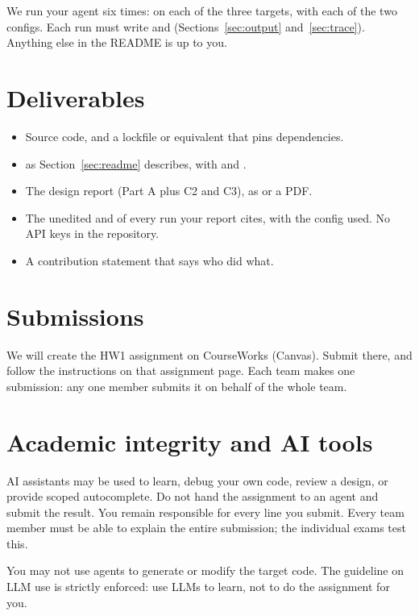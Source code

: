 \documentclass[9pt,letterpaper]{article}
\begin{document}
We run your agent six times: on each of the three targets, with each of the two
configs. Each run must write  and 
(Sections~\ref{sec:output} and~\ref{sec:trace}). Anything else in the README is
up to you.

\section{Deliverables}
\begin{itemize}
\item Source code, and a lockfile or equivalent that pins dependencies.
\item {} as Section~\ref{sec:readme} describes, with
   and .
\item The design report (Part A plus C2 and C3), as  or a PDF.
\item The unedited  and  of every run
  your report cites, with the config used. No API keys in the repository.
\item A contribution statement that says who did what.
\end{itemize}

\section{Submissions}

We will create the HW1 assignment on CourseWorks (Canvas). Submit there, and
follow the instructions on that assignment page. Each team makes one
submission: any one member submits it on behalf of the whole team.

\section{Academic integrity and AI tools}

AI assistants may be used to learn, debug your own code, review a design, or
provide scoped autocomplete. Do not hand the assignment to an agent and submit
the result. You remain responsible for every line you submit. Every team member
must be able to explain the entire submission; the individual exams test this.

You may not use agents to generate or modify the target code. The guideline on
LLM use is strictly enforced: use LLMs to learn, not to do the assignment for
you.
\end{document}
